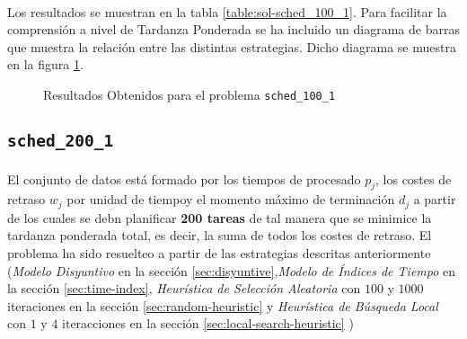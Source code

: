 \documentclass[spanish]{article}
\begin{document}
			\paragraph{}
			Los resultados se muestran en la tabla \ref{table:sol-sched_100_1}. Para facilitar la comprensión a nivel de Tardanza Ponderada se ha incluido un diagrama de barras que muestra la relación entre las distintas estrategias. Dicho diagrama se muestra en la figura \ref{plot:sol-sched_100_1}.


			\begin{figure}
				\begin{center}
				\end{center}
				\caption{Resultados Obtenidos para el problema \texttt{sched\_100\_1}}
				\label{plot:sol-sched_100_1}
			\end{figure}

		\subsection{\texttt{sched\_200\_1}}

			\paragraph{}
			El conjunto de datos está formado por los tiempos de procesado $p_j$, los costes de retraso $w_j$ por unidad de tiempoy el momento máximo de terminación $d_j$ a partir de los cuales se debn planificar \textbf{200 tareas} de tal manera que se minimice la tardanza ponderada total, es decir, la suma de todos los costes de retraso. El problema ha sido resuelteo a partir de las estrategias descritas anteriormente (\emph{Modelo Disyuntivo} en la sección \ref{sec:disyuntive},\emph{Modelo de Índices de Tiempo} en la sección \ref{sec:time-index}, \emph{Heurística de Selección Aleatoria} con $100$ y $1000$ iteraciones en la sección \ref{sec:random-heuristic} y \emph{Heurística de Búsqueda Local} con $1$ y $4$ iteracciones en la sección \ref{sec:local-search-heuristic} )
\end{document}
